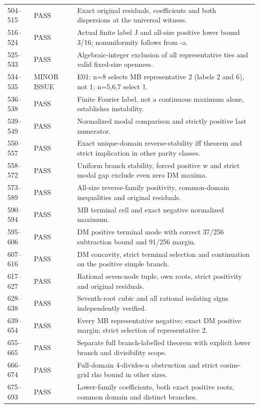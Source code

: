 \documentclass[11pt]{article}
\begin{document}
\begin{longtable}{@{}L{0.10\textwidth}L{0.17\textwidth}L{0.67\textwidth}@{}}
504--515 & PASS & Exact original residuals, coefficients and both dispersions at the universal witness.\\
516--524 & PASS & Actual finite label J and all-size positive lower bound 3/16; nonuniformity follows from -a.\\
525--533 & PASS & Algebraic-integer exclusion of all representative ties and valid fixed-size openness.\\
534--535 & MINOR ISSUE & E01: n=8 selects MB representative 2 (labels 2 and 6), not 1; n=5,6,7 select 1.\\
536--538 & PASS & Finite Fourier label, not a continuous maximum alone, establishes instability.\\
539--549 & PASS & Normalized modal comparison and strictly positive last numerator.\\
550--557 & PASS & Exact unique-domain reverse-stability iff theorem and strict implication in other parity classes.\\
558--572 & PASS & Uniform branch stability, forced positive w and strict modal gap exclude even zero DM maxima.\\
573--589 & PASS & All-size reverse-family positivity, common-domain inequalities and original residuals.\\
590--594 & PASS & MB terminal cell and exact negative normalized maximum.\\
595--606 & PASS & DM positive terminal mode with correct 37/256 subtraction bound and 91/256 margin.\\
607--616 & PASS & DM concavity, strict terminal selection and continuation on the positive simple branch.\\
617--627 & PASS & Rational seven-node tuple, own roots, strict positivity and original residuals.\\
628--638 & PASS & Seventh-root cubic and all rational isolating signs independently verified.\\
639--654 & PASS & Every MB representative negative; exact DM positive margin; strict selection of representative 2.\\
655--665 & PASS & Separate full branch-labelled theorem with explicit lower branch and divisibility scope.\\
666--674 & PASS & Full-domain 4-divides-n obstruction and strict cosine-grid rho bound in other sizes.\\
675--693 & PASS & Lower-family coefficients, both exact positive roots, common domain and distinct branches.\\

\end{longtable}
\end{document}
